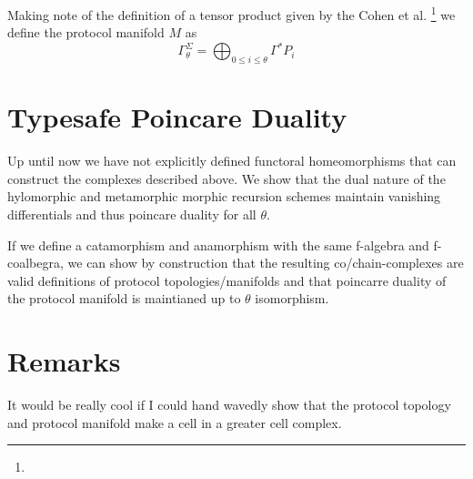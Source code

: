 \documentclass{article}
\begin{document}
Making note of the definition of a tensor product given by the Cohen et al. \footnote{} we define the protocol manifold $M$ as 
\begin{equation} \label{eq1}
\Gamma^{\Sigma}_\theta = \bigoplus_{0 \leq i \leq \theta} \Gamma^* P_i
\end{equation} \label{eq1}

\section{Typesafe Poincare Duality}
Up until now we have not explicitly defined functoral homeomorphisms that can construct the complexes described above. We show that the dual nature of the hylomorphic and metamorphic morphic recursion schemes maintain vanishing differentials and thus poincare duality for all $\theta$.

If we define a catamorphism and anamorphism with the same f-algebra and f-coalbegra, we can show by construction that the resulting co/chain-complexes are valid definitions of protocol topologies/manifolds and that poincarre duality of the protocol manifold is maintianed up to $\theta$ isomorphism.

\section{Remarks}
It would be really cool if I could hand wavedly show that the protocol topology and protocol manifold make a cell in a greater cell complex.


\end{document}
